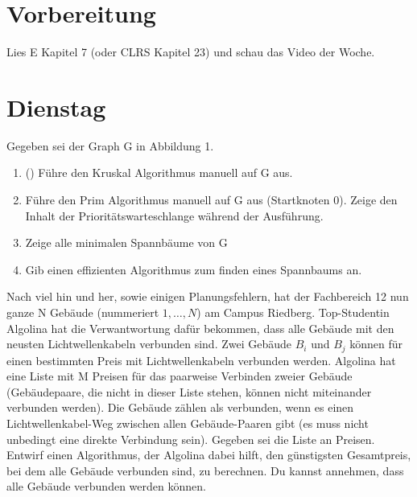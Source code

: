 \documentclass{uebung_cs}
\begin{document}
\section*{Vorbereitung}
Lies E Kapitel 7 (oder CLRS Kapitel 23) und schau das Video der Woche.

\section*{Dienstag}
\begin{aufgabe}\label{tue-first}
	Gegeben sei der Graph G in Abbildung 1.
	\begin{enumerate}
		\item (\warmup) Führe den Kruskal Algorithmus manuell auf G aus.
		\item Führe den Prim Algorithmus manuell auf G aus (Startknoten 0). Zeige den Inhalt der Prioritätswarteschlange während der Ausführung.
		\item Zeige alle minimalen Spannbäume von G
		\item Gib einen effizienten Algorithmus zum finden eines Spannbaums an.
	\end{enumerate}
\end{aufgabe}

\begin{aufgabe}
	Nach viel hin und her, sowie einigen Planungsfehlern, hat der Fachbereich 12 nun ganze N Gebäude (nummeriert $1,\ldots , N$) am Campus Riedberg.
	Top-Studentin Algolina hat die Verwantwortung dafür bekommen, dass alle Gebäude mit den neusten Lichtwellenkabeln verbunden sind.
	Zwei Gebäude $B_i$ und $B_j$ können für einen bestimmten Preis mit Lichtwellenkabeln verbunden werden.
	Algolina hat eine Liste mit M Preisen für das paarweise Verbinden zweier Gebäude (Gebäudepaare, die nicht in dieser Liste stehen, können nicht miteinander verbunden werden).
	Die Gebäude zählen als verbunden, wenn es einen Lichtwellenkabel-Weg zwischen allen Gebäude-Paaren gibt (es muss nicht unbedingt eine direkte Verbindung sein).
	Gegeben sei die Liste an Preisen.
	Entwirf einen Algorithmus, der Algolina dabei hilft, den günstigsten Gesamtpreis, bei dem alle Gebäude verbunden sind, zu berechnen.
	Du kannst annehmen, dass alle Gebäude verbunden werden können. 
\end{aufgabe}
\end{document}
